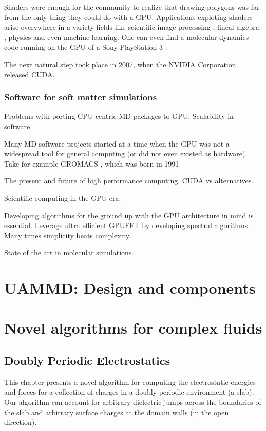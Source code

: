 \documentclass[ twoside,openright,titlepage,numbers=noenddot,%
headinclude,footinclude,cleardoublepage=empty,abstract=on,
BCOR=5mm,paper=a4,fontsize=11pt
]{scrreprt}
\newcommand{\gpu}{\gls{GPU}\xspace}
\begin{document}
Shaders were enough for the community to realize that drawing polygons was far from the only thing they could do with a \gpu\cite{gpgpu2002}. Applications exploting shaders arise everywhere in a variety fields like scientific image processing \cite{gpuimage2003, gpuimage2006}, lineal algebra \cite{gpulinalg2001, gpulinalg2003a, gpulinalg2003b}, physics \cite{gpulbm2004} and even machine learning\cite{gpuml2005, gpuml1998}. One can even find a molecular dynamics code running on the \gpu of a Sony PlayStation 3 \cite{ps3md2009}.

The next natural step took place in 2007, when the NVIDIA Corporation released CUDA\cite{cuda}.
\section{Software for soft matter simulations}
Problems with porting CPU centric \gls{MD} packages to \gpu. Scalability in software.

Many \gls{MD} software projects started at a time when the \gpu was not a widespread tool for general computing (or did not even existed as hardware). Take for example GROMACS \cite{gromacs}, which was born in 1991

The present and future of high performance computing.
CUDA vs alternatives.

Scientific computing in the GPU era.

Developing algorithms for the ground up with the GPU architecture in mind is essential. Leverage ultra efficient \gpu \gls{FFT} by developing spectral algorithms. Many times simplicity beats complexity.

State of the art in molecular simulations.

\cleardoublepage
{}
\part{UAMMD: Design and components}\label{pt:uammd}

\newpage
\newpage
\newpage
\cleardoublepage
\part{Novel algorithms for complex fluids}\label{pt:algo}

\newpage
\chapter{Doubly Periodic Electrostatics}\label{ch:dppoisson}
This chapter presents a novel algorithm for computing the electrostatic energies and forces for a collection of charges in a doubly-periodic environment (a slab). Our algorithm can account for arbitrary dielectric jumps across the boundaries of the slab and arbitrary surface charges at the domain walls (in the open direction).
\end{document}
